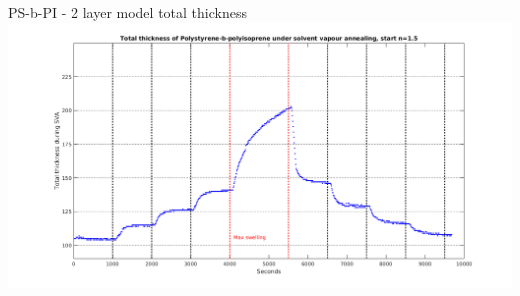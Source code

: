 \documentclass[10pt]{beamer}
\begin{document}
\begin{frame}{PS-b-PI - 2 layer model total thickness}
\centering
\includegraphics[width=\textwidth]{total_thickness_2layer_PSbPI_n15.png}
\end{frame}

	
\end{document}
